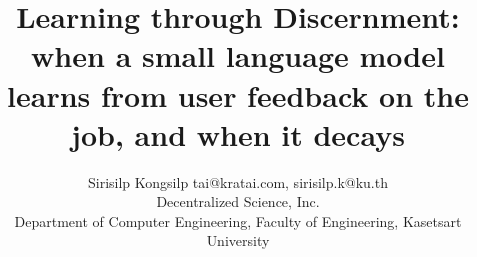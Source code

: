 \documentclass[10pt]{article}
\title{Learning through Discernment: when a small language model learns from user feedback on the job, and when it decays}
\author{\name Sirisilp Kongsilp \email tai@kratai.com, sirisilp.k@ku.th \\
      \addr Decentralized Science, Inc.\\
      \addr Department of Computer Engineering, Faculty of Engineering, Kasetsart University}
\newif\ifanon\anontrue
\begin{document}
\maketitle











\ifanon\else\fi




\appendix
\renewcommand{\thetable}{\Alph{section}\arabic{table}}\renewcommand{\thefigure}{\Alph{section}\arabic{figure}}




\end{document}
